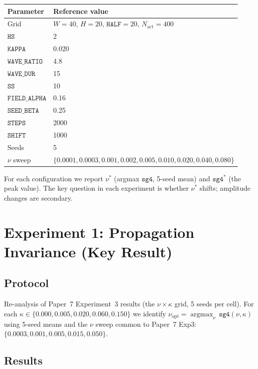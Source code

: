 \documentclass[11pt]{article}
\theoremstyle{remark}
\begin{document}
\begin{center}
\begin{tabular}{ll}
\toprule
Parameter & Reference value \\
\midrule
Grid & $W=40$, $H=20$, $\mathtt{HALF}=20$, $N_{\text{act}}=400$ \\
$\mathtt{HS}$ & 2 \\
$\mathtt{KAPPA}$ & 0.020 \\
$\mathtt{WAVE\_RATIO}$ & 4.8 \\
$\mathtt{WAVE\_DUR}$ & 15 \\
$\mathtt{SS}$ & 10 \\
$\mathtt{FIELD\_ALPHA}$ & 0.16 \\
$\mathtt{SEED\_BETA}$ & 0.25 \\
$\mathtt{STEPS}$ & 2000 \\
$\mathtt{SHIFT}$ & 1000 \\
Seeds & 5 \\
$\nu$ sweep & $\{0.0001, 0.0003, 0.001, 0.002, 0.005, 0.010, 0.020, 0.040, 0.080\}$ \\
\bottomrule
\end{tabular}
\end{center}

For each configuration we report $\nu^*$ (argmax $\mathtt{sg4}$, 5-seed mean)
and $\mathtt{sg4}^*$ (the peak value). The key question in each experiment is
whether $\nu^*$ shifts; amplitude changes are secondary.

\section{Experiment 1: Propagation Invariance (Key Result)}
\label{sec:exp1}

\subsection{Protocol}

Re-analysis of Paper~7 Experiment~3 results (the $\nu \times \kappa$ grid,
5 seeds per cell). For each $\kappa \in \{0.000, 0.005, 0.020, 0.060, 0.150\}$
we identify $\nu_{\text{opt}} = \operatorname{argmax}_\nu\, \mathtt{sg4}(\nu,
\kappa)$ using 5-seed means and the $\nu$ sweep common to Paper~7 Exp3:
$\{0.0003, 0.001, 0.005, 0.015, 0.050\}$.

\subsection{Results}
\end{document}
